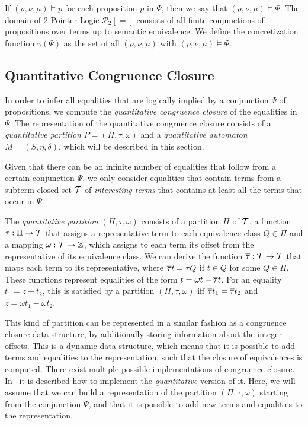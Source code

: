 If $(\rho, \nu, \mu)\models p$ for each proposition $p$ in $\Psi$, then we say that $(\rho, \nu, \mu) \models \Psi$. The domain of 2-Pointer Logic $\mathcal{P}_2[=]$ consists of all finite conjunctions
of propositions over terms up to semantic equivalence.
We define the concretization function $\gamma(\Psi)$ as the set of all $(\rho, \nu, \mu)$ with $(\rho, \nu, \mu) \models \Psi$.

\subsection{Quantitative Congruence Closure}\label{qcc}

In order to infer all equalities that are logically implied by a conjunction $\Psi$ of propositions, we compute the \emph{quantitative congruence closure} of the equalities in $\Psi$.
The representation of the quantitative congruence closure consists of a \emph{quantitative partition} $P = (\Pi,\tau,\omega)$ and a \emph{quantitative automaton} $M = (S, \eta, \delta)$, which will be described in this section.

Given that there can be an infinite number of equalities that follow from a certain conjunction $\Psi$, we only consider equalities that contain terms from a subterm-closed set $\mathcal{T}$ of \emph{interesting terms} that contains at least all the terms that occur in $\Psi$.

The \emph{quantitative partition} $(\Pi, \tau, \omega)$ consists of a partition $\Pi$ of $\mathcal{T}$, a function $\tau : \Pi \rightarrow \mathcal{T}$ that assigns a representative term to each equivalence class $Q \in \Pi$ and a mapping $\omega : \mathcal{T} \rightarrow \mathbb{Z}$, which assigns to each term its offset from the representative of its equivalence class.
We can derive the function $\overline{\tau} : \mathcal{T} \rightarrow \mathcal{T}$ that maps each term to its representative, where $\overline{\tau} t = \tau Q$ if $t \in Q$ for some $Q \in \Pi$.
These functions represent equalities of the form $t = \omega t + \overline{\tau} t$.
For an equality $t_1 = z + t_2$, this is satisfied by a partition $(\Pi, \tau, \omega)$ iff $\overline{\tau} t_1 = \overline{\tau} t_2$ and $z = \omega t_1 - \omega t_2$.

This kind of partition can be represented in a similar fashion as a congruence closure data structure\cite{abstract-cc}, by additionally storing information about the integer offsets.
This is a dynamic data structure, which means that it is possible to add terms and equalities to the representation, such that the closure of equivalences is computed.
There exist multiple possible implementations of congruence closure\cite{cc-nelson, cc-shostak, cc-tarjan}.
In~\cite{2pointer} it is described how to implement the \emph{quantitative} version of it.
Here, we will assume that we can build a representation of the partition $(\Pi, \tau, \omega)$ starting from the conjunction $\Psi$, and that it is possible to add new terms and equalities to the representation.


